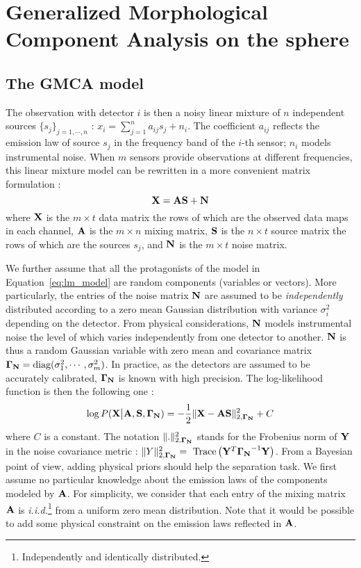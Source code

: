 \section{Generalized Morphological Component Analysis on the sphere}

\label{sec:gmca}
\subsection{The GMCA model}
\label{sec:model}

The observation with detector $i$ is then a noisy linear mixture of $n$ independent sources $\{s_j\}_{j=1,\cdots,n}$ : 
$x_i = \sum_{j=1}^n a_{ij} s_j + n_i$. The coefficient $a_{ij}$ reflects the emission law of source $s_j$ in the 
frequency band of the $i$-th sensor; $n_i$ models instrumental noise. When $m$ sensors provide observations at 
different frequencies, this linear mixture model can be rewritten in a more convenient matrix formulation :
\begin{equation}
\label{eq:lm_model}
{\bf X} = {\bf AS} + {\bf N}
\end{equation}
where ${\bf X}$ is the $m \times t$ data matrix the rows of which are the observed data maps in each channel, ${\bf A}$ 
is the $m \times n$ mixing matrix, ${\bf S}$ is the $n \times t$ source matrix the rows of which are the sources $s_j$, 
and ${\bf N}$ is the $m \times t$ noise matrix.

We further assume that all the protagonists of the model in Equation~\ref{eq:lm_model} are random components (variables 
or vectors). More particularly, the entries of the noise matrix ${\bf N}$ are assumed to be \textit{independently} 
distributed according to a zero mean Gaussian distribution with variance $\sigma_i^2$ depending on the detector. 
From physical considerations, ${\bf N}$ models instrumental noise the level of which varies independently from one 
detector to another. ${\bf N}$ is thus a random Gaussian variable with zero mean and covariance matrix 
${\bf \Gamma_N} = \mbox{diag}(\sigma_1^2,\cdots,\sigma_m^2)$. In practice, as the detectors are assumed to be accurately calibrated, 
${\bf \Gamma_N}$ is known with high precision. The log-likelihood function is then the following one :
\begin{equation}
\label{eq:ll}
\log P({\bf X} \big| {\bf A},{\bf S},{\bf \Gamma_N}) = -\frac{1}{2} \|{\bf X} - {\bf AS}\|_{2,{\bf \Gamma_N}}^2 + C
\end{equation}
where $C$ is a constant. The notation $\| . \|_{2,{\bf \Gamma_N}}^2$ stands for the Frobenius norm of ${\bf Y}$ in the noise 
covariance metric : $\| Y \|_{2,{\bf \Gamma_N}}^2 = \mbox{ Trace}\left( {\bf Y}^T {\bf \Gamma_N}^{-1} {\bf Y}\right)$. 
From a Bayesian point of view, adding physical priors should help the separation task. We first assume no particular knowledge 
about the emission laws of the components modeled by ${\bf A}$. For simplicity, we consider that each entry of the mixing 
matrix ${\bf A}$ is \textit{i.i.d.}\footnote{Independently and identically distributed.} from a uniform zero mean distribution. 
Note that it would be possible to add some physical constraint on the emission laws reflected in ${\bf A}$.

